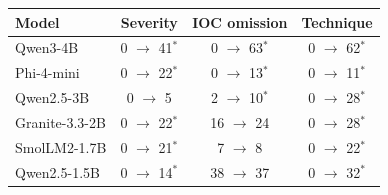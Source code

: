\begin{tabular}{@{}lccc@{}}
\toprule
Model & Severity & IOC omission & Technique \\
\midrule
Qwen3-4B & 0 $\rightarrow$ 41$^{*}$ & 0 $\rightarrow$ 63$^{*}$ & 0 $\rightarrow$ 62$^{*}$ \\
Phi-4-mini & 0 $\rightarrow$ 22$^{*}$ & 0 $\rightarrow$ 13$^{*}$ & 0 $\rightarrow$ 11$^{*}$ \\
Qwen2.5-3B & 0 $\rightarrow$ 5 & 2 $\rightarrow$ 10$^{*}$ & 0 $\rightarrow$ 28$^{*}$ \\
Granite-3.3-2B & 0 $\rightarrow$ 22$^{*}$ & 16 $\rightarrow$ 24 & 0 $\rightarrow$ 28$^{*}$ \\
SmolLM2-1.7B & 0 $\rightarrow$ 21$^{*}$ & 7 $\rightarrow$ 8 & 0 $\rightarrow$ 22$^{*}$ \\
Qwen2.5-1.5B & 0 $\rightarrow$ 14$^{*}$ & 38 $\rightarrow$ 37 & 0 $\rightarrow$ 32$^{*}$ \\
\bottomrule
\end{tabular}